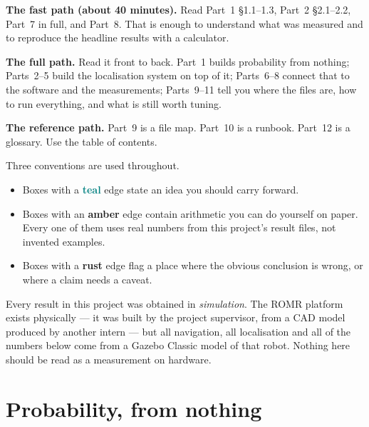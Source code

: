 \documentclass[11pt,a4paper]{report}
\begin{document}
\begin{plain}
\textbf{The fast path (about 40 minutes).} Read Part~1 \S1.1--1.3,
Part~2 \S2.1--2.2, Part~7 in full, and Part~8. That is enough to understand what
was measured and to reproduce the headline results with a calculator.

\smallskip
\textbf{The full path.} Read it front to back. Part~1 builds probability from
nothing; Parts~2--5 build the localisation system on top of it; Parts~6--8
connect that to the software and the measurements; Parts~9--11 tell you where
the files are, how to run everything, and what is still worth tuning.

\smallskip
\textbf{The reference path.} Part~9 is a file map. Part~10 is a runbook.
Part~12 is a glossary. Use the table of contents.
\end{plain}

\medskip
Three conventions are used throughout.

\begin{itemize}[leftmargin=1.4em,itemsep=3pt]
\item Boxes with a \textcolor{teal}{\textbf{teal}} edge state an idea you
should carry forward.
\item Boxes with an \textcolor{amber}{\textbf{amber}} edge contain arithmetic
you can do yourself on paper. Every one of them uses real numbers from this
project's result files, not invented examples.
\item Boxes with a \textcolor{rust}{\textbf{rust}} edge flag a place where the
obvious conclusion is wrong, or where a claim needs a caveat.
\end{itemize}

\medskip
\begin{warnbox}
Every result in this project was obtained in \emph{simulation}. The ROMR
platform exists physically --- it was built by the project supervisor, from a
CAD model produced by another intern --- but all navigation, all localisation
and all of the numbers below come from a Gazebo Classic model of that robot.
Nothing here should be read as a measurement on hardware.
\end{warnbox}

\tableofcontents

\chapter{Probability, from nothing}
\label{ch:prob}
\end{document}
